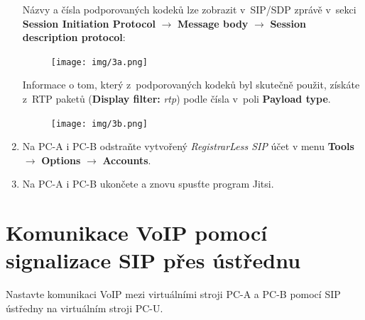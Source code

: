 \begin{enumerate}
Názvy a čísla podporovaných kodeků lze zobrazit v SIP/SDP zprávě v sekci {\bf Session Initiation Protocol} $\rightarrow$ {\bf Message body} $\rightarrow$ {\bf Session description protocol}:
\begin{figure}[H]
  \centering
  \texttt{[image: img/3a.png]}
\end{figure}

\noindent Informace o tom, který z podporovaných kodeků byl skutečně použit, získáte z RTP paketů (\textbf{Display filter:} \emph{rtp}) podle čísla v poli {\bf Payload type}.
\begin{figure}[H]
  \centering
  \texttt{[image: img/3b.png]}
\end{figure}


    \item Na PC-A i PC-B odstraňte vytvořený {\it RegistrarLess SIP} účet v menu {\bf Tools} $\rightarrow$ {\bf Options} $\rightarrow$ {\bf Accounts}.
    \item Na PC-A i PC-B ukončete a znovu spusťte program Jitsi.
\end{enumerate}

\section{Komunikace VoIP pomocí signalizace SIP přes ústřednu}
Nastavte komunikaci VoIP mezi virtuálními stroji PC-A a PC-B pomocí SIP ústředny na virtuálním stroji PC-U.

